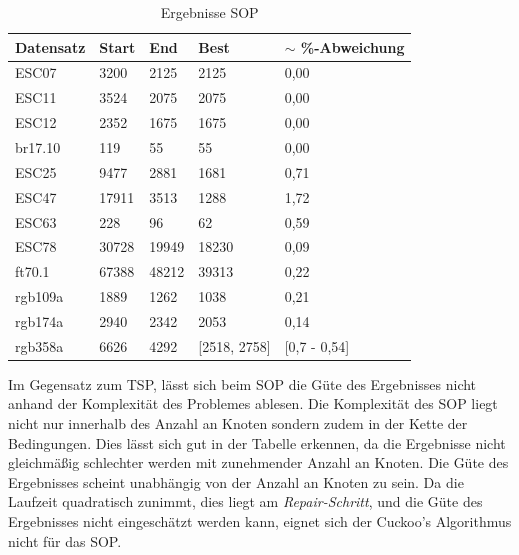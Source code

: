 \documentclass[conference]{IEEEtran}
\begin{document}
      \begin{table}[]
        \label{table:SOP}
        \centering
        \begin{tabular}{|l|ll|l|l|}
        \hline
            Datensatz & \multicolumn{1}{l|}{Start} & End  & Best & $\sim$ \%-Abweichung \\ \hline
            ESC07  & \multicolumn{1}{l|}{3200} & 2125 & 2125  & 0,00       \\ \hline
            ESC11  & \multicolumn{1}{l|}{3524} & 2075 & 2075 & 0,00       \\ \hline
            ESC12  & \multicolumn{1}{l|}{2352} & 1675 & 1675 & 0,00       \\ \hline

            br17.10  & \multicolumn{1}{l|}{119} & 55 & 55 & 0,00       \\ \hline


            ESC25  & \multicolumn{1}{l|}{9477} & 2881 & 1681 & 0,71       \\ \hline
            
            ESC47  & \multicolumn{1}{l|}{17911} & 3513 & 1288 &  1,72      \\ \hline

            ESC63  & \multicolumn{1}{l|}{228} & 96 & 62 & 0,59       \\ \hline

            ESC78 & \multicolumn{1}{l|}{30728} & 19949 & 18230 &  0,09     \\ \hline
            ft70.1 & \multicolumn{1}{l|}{67388} & 48212 & 39313 &   0,22     \\ \hline

            rgb109a  & \multicolumn{1}{l|}{1889} & 1262 & 1038 &  0,21      \\ \hline

            rgb174a  & \multicolumn{1}{l|}{2940} & 2342 & 2053 & 0,14       \\ \hline
            rgb358a  & \multicolumn{1}{l|}{6626} & 4292 & [2518, 2758] & [0,7 - 0,54]       \\ \hline
        \end{tabular}
        \caption{Ergebnisse SOP}
      \end{table}

      Im Gegensatz zum TSP, lässt sich beim SOP die Güte des Ergebnisses nicht anhand der Komplexität des Problemes ablesen. 
      Die Komplexität des SOP liegt nicht nur innerhalb des Anzahl an Knoten sondern zudem in der Kette der Bedingungen. Dies lässt sich gut 
      in der Tabelle erkennen, da die Ergebnisse nicht gleichmäßig schlechter werden mit zunehmender Anzahl an Knoten. 
      Die Güte des Ergebnisses scheint unabhängig von der Anzahl an Knoten zu sein. 
      Da die Laufzeit quadratisch zunimmt, dies liegt am \textit{Repair-Schritt}, und die Güte des Ergebnisses nicht 
      eingeschätzt werden kann, eignet sich der Cuckoo's Algorithmus nicht für das SOP.
\end{document}
